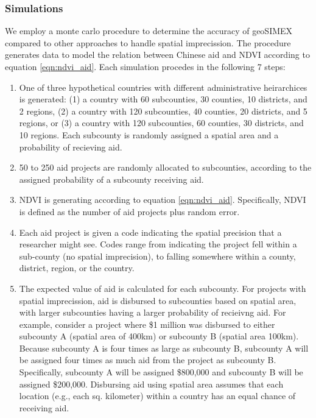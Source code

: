 \subsubsection{Simulations}

We employ a monte carlo procedure to determine the accuracy of geoSIMEX compared to other approaches to handle spatial imprecission. The procedure generates data to model the relation between Chinese aid and NDVI according to equation \ref{eqn:ndvi_aid}. Each simulation procedes in the following 7 steps:

\begin{enumerate}
\item One of three hypothetical countries with different administrative heirarchices is generated: (1) a country with 60 subcounties, 30 counties, 10 districts, and 2 regions, (2) a country with 120 subcounties, 40 counties, 20 districts, and 5 regions, or (3) a country with 120 subcounties, 60 counties, 30 districts, and 10 regions. Each subcounty is randomly assigned a spatial area and a probability of recieving aid. 
\item 50 to 250 aid projects are randomly allocated to subcounties, according to the assigned probability of a subcounty receiving aid. 
\item NDVI is generating according to equation \ref{eqn:ndvi_aid}. Specifically, NDVI is defined as the number of aid projects plus random error.
\item Each aid project is given a code indicating the spatial precision that a researcher might see. Codes range from indicating the project fell within a sub-county (no spatial imprecision), to falling somewhere within a county, district, region, or the country. 
\item The expected value of aid is calculated for each subcounty. For projects with spatial imprecission, aid is disbursed to subcounties based on spatial area, with larger subcounties having a larger probability of recieivng aid. For example, consider a project where \$1 million was disbursed to either subcounty A (spatial area of 400km) or subcounty B (spatial area 100km). Because subcounty A is four times as large as subcounty B, subcounty A will be assigned four times as much aid from the project as subcounty B. Specifically, subcounty A will be assigned \$800,000 and subcounty B will be assigned \$200,000. Disbursing aid using spatial area assumes that each location (e.g., each sq. kilometer) within a country has an equal chance of receiving aid.

\end{enumerate}

